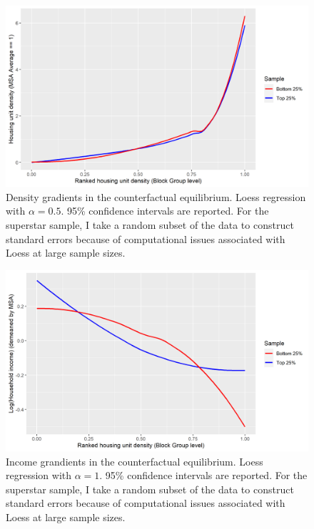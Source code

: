 \documentclass[]{article}
\begin{document}
\begin{figure}[htbp]
	\centering
	
\includegraphics[width=\textwidth]{Density_dist_ctfcl.png}
	\caption{Density gradients in the counterfactual equilibrium. Loess regression with $\alpha = 0.5$. 95\% confidence intervals are reported. For the superstar sample, I take a random subset of the data to construct standard errors because of computational issues associated with Loess at large sample sizes.}\label{ctfl_density_dist}
	
\end{figure}

\begin{figure}[htbp]
	\centering
\includegraphics[width=\textwidth]{Income_dist_ctfcl.png}
	\caption{Income grandients in the counterfactual equilibrium. Loess regression with $\alpha = 1$. 95\% confidence intervals are reported. For the superstar sample, I take a random subset of the data to construct standard errors because of computational issues associated with Loess at large sample sizes.}\label{ctfl_inc_sorting}
	
\end{figure}
\end{document}
